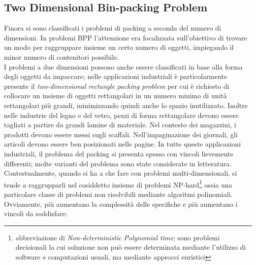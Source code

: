 \documentclass[12pt,a4paper,openright,twoside]{report}
\begin{document}
\subsection{Two Dimensional Bin-packing Problem}
Finora si sono classificati i problemi di packing a seconda del numero di dimensioni. In problemi BPP l'attenzione era focalizzata sull'obiettivo di trovare un modo per raggruppare insieme un certo numero di oggetti, impiegando il minor numero di contenitori possibile.\\ I problemi a due dimensioni possono anche essere classificati in base alla forma degli oggetti da impaccare; nelle applicazioni industriali \`{e} particolarmente presente il \textit{two-dimensional rectangle packing problem} per cui \`{e} richiesto di collocare un insieme di oggetti rettangolari in un numero minimo di unit\`{a} rettangolari pi\`{u} grandi, minimizzando quindi anche lo spazio inutilizzato. Inoltre nelle industrie del legno e del vetro, pezzi di forma rettangolare devono essere tagliati a partire da grandi lamine di materiale. Nel contesto dei magazzini, i prodotti devono essere messi sugli scaffali. Nell'impaginazione dei giornali, gli articoli devono essere ben posizionati nelle pagine. In tutte queste applicazioni industriali, il problema del packing si presenta spesso con vincoli lievemente differenti; molte varianti del problema sono state considerate in letteratura.\\
Contestualmente, quando si ha a che fare con problemi multi-dimensionali, si tende a raggrupparli nel cosiddetto insieme di problemi NP-hard\footnote{abbreviazione di \textit{Non-deterministic Polynomial time}; sono problemi decisionali la cui soluzione non pu\`{o} essere determinata mediante l'utilizzo di software e computazioni usuali, ma mediante approcci euristici} ossia una particolare classe di problemi non risolvibili mediante algoritmi polinomiali. 
Ovviamente, pi\`{u} aumentano la complessit\`{a} delle specifiche e pi\`{u} aumentano i vincoli da soddisfare:
\end{document}
